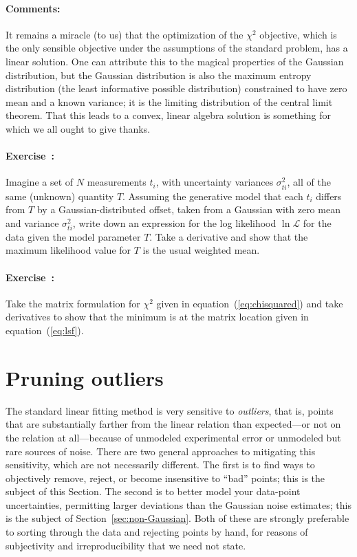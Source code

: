 \documentclass[12pt,twoside]{article}
\newcommand{\sectionname}{Section}
\newcommand{\equationname}{equation}
\newcommand{\problemname}{Exercise}
\newcommand{\commentsname}{Comments}
\newcounter{problem}
\newenvironment{problem}{\paragraph{\problemname~\theproblem:}\refstepcounter{problem}}{}
\newenvironment{comments}{\paragraph{\commentsname:}}{}
\newcommand{\like}{\mathscr{L}}
\begin{document}
\begin{comments}
It remains a miracle (to us) that the optimization of the $\chi^2$
objective, which is the only sensible objective under the assumptions
of the standard problem, has a linear solution.  One can attribute
this to the magical properties of the Gaussian distribution, but the
Gaussian distribution is also the maximum entropy distribution (the
least informative possible distribution) constrained to have zero mean
and a known variance; it is the limiting distribution of the central
limit theorem.  That this leads to a convex, linear algebra solution
is something for which we all ought to give thanks.
\end{comments}

\begin{problem}
Imagine a set of $N$ measurements $t_i$, with uncertainty variances
$\sigma_{ti}^2$, all of the same (unknown) quantity $T$.  Assuming the
generative model that each $t_i$ differs from $T$ by a
Gaussian-distributed offset, taken from a Gaussian with zero mean and
variance $\sigma_{ti}^2$, write down an expression for the log
likelihood $\ln\like$ for the data given the model parameter $T$.
Take a derivative and show that the maximum likelihood value for $T$
is the usual weighted mean.
\end{problem}

\begin{problem}
Take the matrix formulation for $\chi^2$ given in
\equationname~(\ref{eq:chisquared}) and take derivatives to show that
the minimum is at the matrix location given in
\equationname~(\ref{eq:lsf}).
\end{problem}

\section{Pruning outliers}\label{sec:outliers}

The standard linear fitting method is very sensitive to
\emph{outliers}, that is, points that are substantially farther from
the linear relation than expected---or not on the relation at
all---because of unmodeled experimental error or unmodeled but rare
sources of noise.  There are two general approaches to mitigating this
sensitivity, which are not necessarily different.  The first is to
find ways to objectively remove, reject, or become insensitive to
``bad'' points; this is the subject of this \sectionname.  The second
is to better model your data-point uncertainties, permitting larger
deviations than the Gaussian noise estimates; this is the subject of
\sectionname~\ref{sec:non-Gaussian}.  Both of these are strongly
preferable to sorting through the data and rejecting points by hand,
for reasons of subjectivity and irreproducibility that we need not
state.
\end{document}

